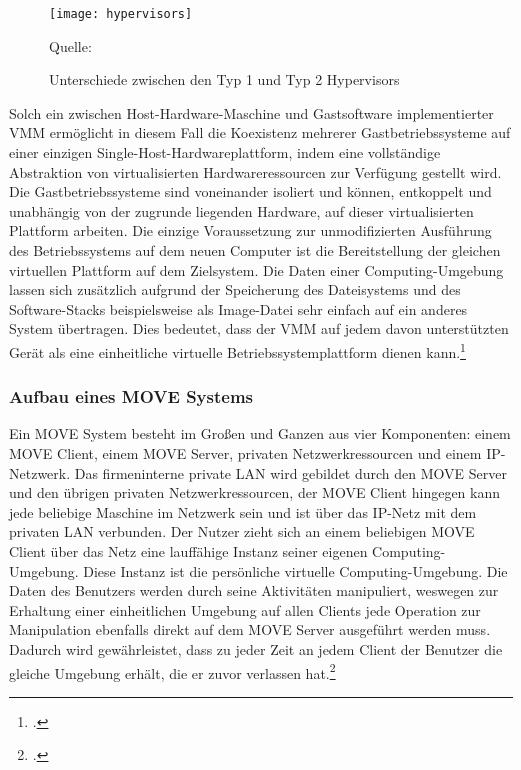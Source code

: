 \begin{figure}[H]
\begin{center}
\texttt{[image: hypervisors]}
\caption{Unterschiede zwischen den Typ 1 und Typ 2 Hypervisors}
Quelle: \cite[]{ibm}
\end{center}
\end{figure}
\vspace{-1cm}

Solch ein zwischen Host-Hardware-Maschine und Gastsoftware implementierter VMM ermöglicht in diesem Fall die Koexistenz mehrerer Gastbetriebssysteme auf einer einzigen Single-Host-Hardwareplattform, indem eine vollständige Abstraktion von virtualisierten Hardwareressourcen zur Verfügung gestellt wird. Die Gastbetriebssysteme sind voneinander isoliert und können, entkoppelt und unabhängig von der zugrunde liegenden Hardware, auf dieser virtualisierten Plattform arbeiten. Die einzige Voraussetzung zur unmodifizierten Ausführung des Betriebssystems auf dem neuen Computer ist die Bereitstellung der gleichen virtuellen Plattform auf dem Zielsystem. Die Daten einer Computing-Umgebung lassen sich zusätzlich aufgrund der Speicherung des Dateisystems und des Software-Stacks beispielsweise als Image-Datei sehr einfach auf ein anderes System übertragen. Dies bedeutet, dass der VMM auf jedem davon unterstützten Gerät als eine einheitliche virtuelle Betriebssystemplattform dienen kann.\footcite[Vgl.][Seite 891]{MOVE}

\subsubsection{Aufbau eines MOVE Systems}
Ein MOVE System besteht im Großen und Ganzen aus vier Komponenten: einem MOVE Client, einem MOVE Server, privaten Netzwerkressourcen und einem IP-Netzwerk. Das firmeninterne private LAN wird gebildet durch den MOVE Server und den übrigen privaten Netzwerkressourcen, der MOVE Client hingegen kann jede beliebige Maschine im Netzwerk sein und ist über das IP-Netz mit dem privaten LAN verbunden. 
Der Nutzer zieht sich an einem beliebigen MOVE Client über das Netz eine lauffähige Instanz seiner eigenen Computing-Umgebung. Diese Instanz ist die persönliche virtuelle Computing-Umgebung. Die Daten des Benutzers werden durch seine Aktivitäten manipuliert, weswegen zur Erhaltung einer einheitlichen Umgebung auf allen Clients jede Operation zur Manipulation ebenfalls direkt auf dem MOVE Server ausgeführt werden muss. Dadurch wird gewährleistet, dass zu jeder Zeit an jedem Client der Benutzer die gleiche Umgebung erhält, die er zuvor verlassen hat.\footcite[Vgl.][Seite 891 f.]{MOVE}

